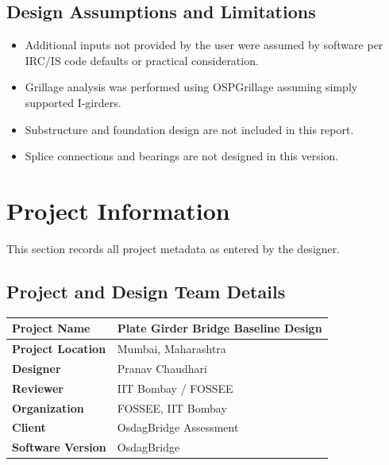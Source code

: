 \documentclass[12pt,a4paper]{report}
\numberwithin{table}{chapter}
\numberwithin{figure}{chapter}
\begin{document}
\section*{Design Assumptions and Limitations}
\label{sec:assumptions}

\begin{itemize}
\item Additional inputs not provided by the user were assumed by software per IRC/IS code defaults or practical consideration.
\item Grillage analysis was performed using OSPGrillage assuming simply supported I-girders.
\item Substructure and foundation design are not included in this report.
\item Splice connections and bearings are not designed in this version.
\end{itemize}

\titleformat{\chapter}[block]{\normalfont\Large\bfseries\centering}{\thechapter}{1em}{}
\titlespacing*{\chapter}{0pt}{-30pt}{10pt}


\chapter{Project Information}

This section records all project metadata as entered by the designer.

\section{Project and Design Team Details}
\label{sec:project-details}

\begin{tabular}{|L{5.5cm}|L{8.5cm}|}
\hline
\textbf{Project Name} & Plate Girder Bridge Baseline Design \\
\hline
\textbf{Project Location} & Mumbai, Maharashtra \\
\hline
\textbf{Designer} & Pranav Chaudhari \\
\hline
\textbf{Reviewer} & IIT Bombay / FOSSEE \\
\hline
\textbf{Organization} & FOSSEE, IIT Bombay \\
\hline
\textbf{Client} & OsdagBridge Assessment \\
\hline
\textbf{Software Version} & OsdagBridge \\
\hline
\end{tabular}
\end{document}
